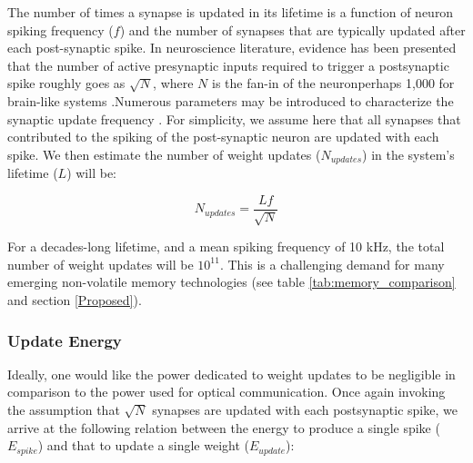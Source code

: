 \documentclass[twocolumn]{article}
\begin{document}
The number of times a synapse is updated in its lifetime is a function of neuron spiking frequency ($f$) and the number of synapses that are typically updated after each post-synaptic spike. In neuroscience literature, evidence has been presented that the number of active presynaptic inputs required to trigger a postsynaptic spike roughly goes as $\sqrt{N}$, where $N$ is the fan-in of the neuron\textemdash perhaps 1,000 for brain-like systems \cite{vrso1996,vora2005}.Numerous parameters may be introduced to characterize the synaptic update frequency \cite{fuab2007}. For simplicity, we assume here that all synapses that contributed to the spiking of the post-synaptic neuron are updated with each spike. We then estimate the number of weight updates ($N_{updates}$) in the system's lifetime ($L$) will be:

\begin{equation}
    N_{updates} = \frac{Lf}{\sqrt{N}}
\end{equation}

For a decades-long lifetime, and a mean spiking frequency of 10 kHz, the total number of weight updates will be $10^{11}$. This is a challenging demand for many emerging non-volatile memory technologies (see table \ref{tab:memory_comparison} and section \ref{Proposed}).

\subsubsection{Update Energy}
Ideally, one would like the power dedicated to weight updates to be negligible in comparison to the power used for optical communication. Once again invoking the assumption that $\sqrt{N}$ synapses are updated with each postsynaptic spike, we arrive at the following relation between the energy to produce a single spike ($E_{spike}$) and that to update a single weight ($E_{update}$):
\end{document}
